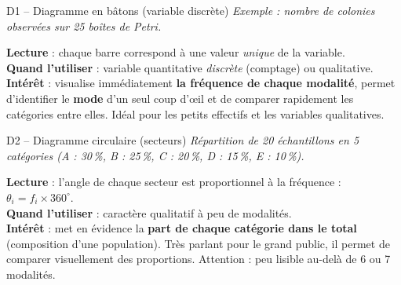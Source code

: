 \documentclass[11pt,a4paper]{article}
\begin{document}
\vspace{0.3cm}

\begin{vignetteCours}{D1 -- Diagramme en bâtons (variable discrète)}
\emph{Exemple : nombre de colonies observées sur 25 boîtes de Petri.}
\begin{center}
\end{center}
\textbf{Lecture} : chaque barre correspond à une valeur \emph{unique} de la variable.\\
\textbf{Quand l'utiliser} : variable quantitative \emph{discrète} (comptage) ou qualitative.\\
\textbf{Intérêt} : visualise immédiatement \textbf{la fréquence de chaque modalité}, permet d'identifier le \textbf{mode} d'un seul coup d'œil et de comparer rapidement les catégories entre elles. Idéal pour les petits effectifs et les variables qualitatives.
\end{vignetteCours}

\begin{vignetteCours}{D2 -- Diagramme circulaire (secteurs)}
\emph{Répartition de 20 échantillons en 5 catégories (A : 30\,\%, B : 25\,\%, C : 20\,\%, D : 15\,\%, E : 10\,\%).}
\begin{center}
\end{center}
\textbf{Lecture} : l'angle de chaque secteur est proportionnel à la fréquence : $\theta_i = f_i \times 360^\circ$.\\
\textbf{Quand l'utiliser} : caractère qualitatif à peu de modalités.\\
\textbf{Intérêt} : met en évidence la \textbf{part de chaque catégorie dans le total} (composition d'une population). Très parlant pour le grand public, il permet de comparer visuellement des proportions. Attention : peu lisible au-delà de 6 ou 7 modalités.
\end{vignetteCours}
\end{document}
